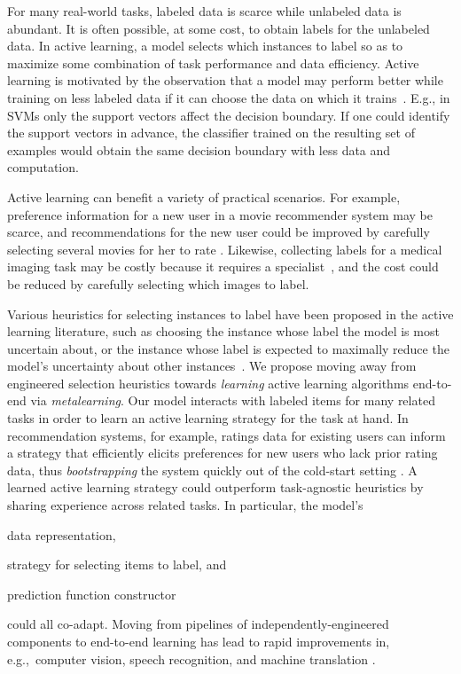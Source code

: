 
For many real-world tasks, labeled data is scarce while unlabeled data is abundant.
It is often possible, at some cost, to obtain labels for the unlabeled data.
In active learning, a model selects which instances to label so as to maximize some combination of task performance and data efficiency.
Active learning is motivated by the observation that a model may perform better while training on less labeled data if it can choose the data on which it trains~\citep{cohn1996active}.
E.g., in SVMs \citep{scholkopf2002} only the support vectors affect the decision boundary.
If one could identify the support vectors in advance, the classifier trained on the resulting set of examples would obtain the same decision boundary with less data and computation.

Active learning can benefit a variety of practical scenarios. For example, preference information for a new user in a movie recommender system may be scarce, and recommendations for the new user could be improved by carefully selecting several movies for her to rate \cite{sun2013cold,houlsby2014cold,aggarwal2016recommender}.
Likewise, collecting labels for a medical imaging task may be costly because it requires a specialist~\cite{medical}, and the cost could be reduced by carefully selecting which images to label.

Various heuristics for selecting instances to label have been proposed in the active learning literature, such as choosing the instance whose label the model is most uncertain about, or the instance whose label is expected to maximally reduce the model's uncertainty about other instances~\citep{gilad2005query,settles2010active,houlsby2011bayesian}.
We propose moving away from engineered selection heuristics towards \emph{learning} active learning algorithms end-to-end via \emph{metalearning}. Our model interacts with labeled items for many related tasks in order to learn an active learning strategy for the task at hand.
In recommendation systems, for example, ratings data for existing users can inform a strategy that efficiently elicits preferences for new users who lack prior rating data, thus \emph{bootstrapping} the system quickly out of the cold-start setting \citep{golbandi2010, golbandi2011, sun2013, kawale2015}.
A learned active learning strategy could outperform task-agnostic heuristics by sharing experience across related tasks. In particular, the model's
\begin{enumerate*}[(i)]
\item data representation, 
\item strategy for selecting items to label, and
\item prediction function constructor
\end{enumerate*}
could all co-adapt.
Moving from pipelines of independently-engineered components to end-to-end learning has lead to rapid improvements in, e.g.,~computer vision, speech recognition, and machine translation \citep{krizhevsky2012, hannun2014, he2016, wu2016}.

